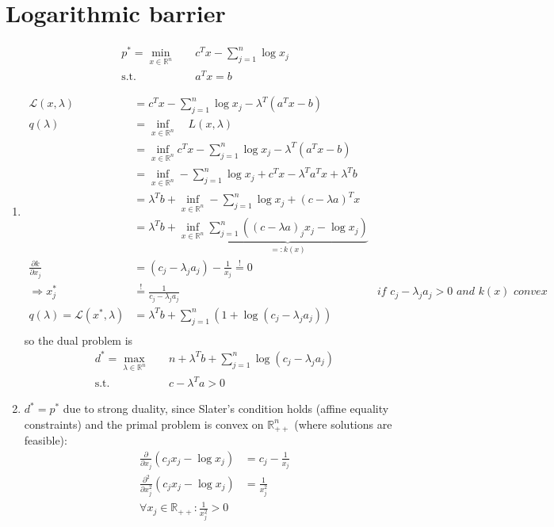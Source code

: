 \documentclass[oneside, a4paper]{book}
\begin{document}
\section{Logarithmic barrier}
\begin{align*}
  p^* = \min_{x\in\mathds{R}^n}\quad &c^Tx-\sum_{j=1}^n \log x_j \\
  \text{s.t.}\quad  & a^Tx = b
\end{align*}
\begin{enumerate}
  \item \begin{align*}
    \mathcal{L}(x,\lambda) &= c^Tx-\sum_{j=1}^n \log x_j - \lambda^T \left(a^Tx - b\right)\\
    q(\lambda) &= \inf_{x\in\mathds{R}^n} \quad L(x,\lambda)\\
    &=  \inf_{x\in\mathds{R}^n} c^Tx-\sum_{j=1}^n \log x_j - \lambda^T \left(a^Tx - b\right)\\
    &=  \inf_{x\in\mathds{R}^n} -\sum_{j=1}^n \log x_j + c^Tx -\lambda^Ta^Tx + \lambda^Tb\\
    &=  \lambda^Tb + \inf_{x\in\mathds{R}^n} -\sum_{j=1}^n \log x_j + (c -\lambda a)^T x\\
    &=  \lambda^Tb + \inf_{x\in\mathds{R}^n} \underbrace{\sum_{j=1}^n \left((c -\lambda a)_j x_j -\log x_j \right)}_{=:k(x)}\\
    \frac{\partial k}{\partial x_j} &= (c_j - \lambda_j a_j) - \frac{1}{x_j} \overset{!}{=} 0\\
    \Longrightarrow x_j^* &\overset{!}{=} \frac{1}{c_j - \lambda_j a_j} &\textit{if $c_j-\lambda_j a_j > 0$ and $k(x)$ convex}\\
    q(\lambda) = \mathcal{L}(x^*, \lambda) &= \lambda^Tb + \sum_{j=1}^n \left(1 + \log (c_j - \lambda_j a_j)\right)\\
  \end{align*}
  so the dual problem is
  \begin{align*}
    d^* = \max_{\lambda\in\mathds{R}^n}\quad& n + \lambda^Tb + \sum_{j=1}^n \log (c_j - \lambda_j a_j)\\
    \text{s.t.}\quad& c-\lambda^T a > 0
  \end{align*}
  \item $d^* = p^*$ due to strong duality, since Slater's condition holds (affine equality constraints) and the primal problem is convex on $\mathds{R}^n_{++}$ (where solutions are feasible):
  \begin{align*}
    \frac{\partial}{\partial x_j} \left(c_j x_j - \log x_j\right) &= c_j - \frac{1}{x_j}\\
    \frac{\partial^2}{\partial x_j^2} \left(c_j x_j - \log x_j\right) &=  \frac{1}{x_j^2} \\
    \forall x_j \in\mathds{R}_{++}: \frac{1}{x_j^2} > 0
  \end{align*}
\end{enumerate}
\end{document}
